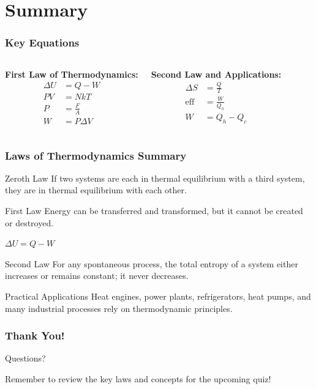 \documentclass{beamer}
\begin{document}
\section{Summary}

\begin{frame}
    \frametitle{Key Equations}
    \begin{columns}
        \textbf{First Law of Thermodynamics:}
        \begin{align*}
            \Delta U &= Q - W \\
            PV &= NkT \\
            P &= \frac{F}{A} \\
            W &= P\Delta V
        \end{align*}
        
        \textbf{Second Law and Applications:}
        \begin{align*}
            \Delta S &= \frac{Q}{T} \\
            \text{eff} &= \frac{W}{Q_h} \\
            W &= Q_h - Q_c
        \end{align*}
    \end{columns}
\end{frame}

\begin{frame}
    \frametitle{Laws of Thermodynamics Summary}
    \begin{block}{Zeroth Law}
        If two systems are each in thermal equilibrium with a third system, they are in thermal equilibrium with each other.
    \end{block}
    
    \begin{block}{First Law}
        Energy can be transferred and transformed, but it cannot be created or destroyed.
        
        $\Delta U = Q - W$
    \end{block}
    
    \begin{block}{Second Law}
        For any spontaneous process, the total entropy of a system either increases or remains constant; it never decreases.
    \end{block}
    
    \begin{block}{Practical Applications}
        Heat engines, power plants, refrigerators, heat pumps, and many industrial processes rely on thermodynamic principles.
    \end{block}
\end{frame}

\begin{frame}
    \frametitle{Thank You!}
    \begin{center}
        \Huge{Questions?}
        
        \vspace{1cm}
        \normalsize
        Remember to review the key laws and concepts for the upcoming quiz!
    \end{center}
\end{frame}
\end{document}
